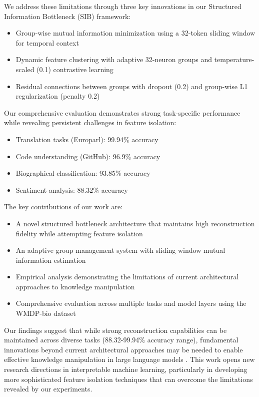 \documentclass{article} %
\begin{document}
We address these limitations through three key innovations in our Structured Information Bottleneck (SIB) framework:
\begin{itemize}
    \item Group-wise mutual information minimization using a 32-token sliding window for temporal context
    \item Dynamic feature clustering with adaptive 32-neuron groups and temperature-scaled (0.1) contrastive learning
    \item Residual connections between groups with dropout (0.2) and group-wise L1 regularization (penalty 0.2)
\end{itemize}

Our comprehensive evaluation demonstrates strong task-specific performance while revealing persistent challenges in feature isolation:
\begin{itemize}
    \item Translation tasks (Europarl): 99.94\% accuracy
    \item Code understanding (GitHub): 96.9\% accuracy
    \item Biographical classification: 93.85\% accuracy
    \item Sentiment analysis: 88.32\% accuracy
\end{itemize}

The key contributions of our work are:
\begin{itemize}
    \item A novel structured bottleneck architecture that maintains high reconstruction fidelity while attempting feature isolation
    \item An adaptive group management system with sliding window mutual information estimation
    \item Empirical analysis demonstrating the limitations of current architectural approaches to knowledge manipulation
    \item Comprehensive evaluation across multiple tasks and model layers using the WMDP-bio dataset
\end{itemize}

Our findings suggest that while strong reconstruction capabilities can be maintained across diverse tasks (88.32-99.94\% accuracy range), fundamental innovations beyond current architectural approaches may be needed to enable effective knowledge manipulation in large language models \cite{vaswani2017attention}. This work opens new research directions in interpretable machine learning, particularly in developing more sophisticated feature isolation techniques that can overcome the limitations revealed by our experiments.
\end{document}
